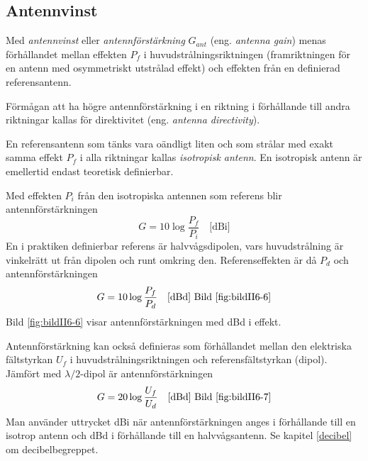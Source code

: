 \subsection{Antennvinst}

Med \emph{antennvinst} eller \emph{antennförstärkning} \(G_{ant}\) (eng.
\emph{antenna gain}) menas förhållandet mellan effekten \(P_f\) i
huvudstrålningsriktningen (framriktningen för en antenn med osymmetriskt
utstrålad effekt) och effekten från en definierad referensantenn.

Förmågan att ha högre antennförstärkning i en riktning i förhållande till andra
riktningar kallas för direktivitet (eng. \emph{antenna directivity}).

En referensantenn som tänks vara oändligt liten och som strålar med exakt
samma effekt \(P_f\) i alla riktningar kallas \emph{isotropisk antenn}.
En isotropisk antenn är emellertid endast teoretisk definierbar.

Med effekten \(P_i\) från den isotropiska antennen som referens blir
antennförstärkningen
\[G = 10 \log\frac{P_f}{P_i} \quad \text{[dBi]}\]
En i praktiken definierbar referens är halvvågsdipolen, vars
huvudstrålning är vinkelrätt ut från dipolen och runt omkring den.
Referenseffekten är då \(P_d\) och antennförstärkningen
\[G = 10 \log\frac{P_f}{P_d} \quad \text{[dBd] Bild \ref{fig:bildII6-6}}\]
Bild \ref{fig:bildII6-6} visar antennförstärkningen med dBd i effekt.



Antennförstärkning kan också definieras som förhållandet mellan den elektriska
fältstyrkan \(U_f\) i huvudstrålningsriktningen och referensfältstyrkan (dipol).
Jämfört med \(\lambda/2\)-dipol är antennförstärkningen
\[G = 20 \log\frac{U_f}{U_d} \quad \text{[dBd] Bild \ref{fig:bildII6-7}}\]
Man använder uttrycket dBi när antennförstärkningen anges i förhållande till
en isotrop antenn och dBd i förhållande till en halvvågsantenn.
Se kapitel \ref{decibel} om decibelbegreppet.

